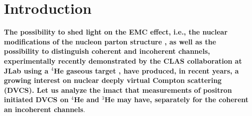 \documentclass[times, twoside]{PosWhiPap}
\begin{document}
\section*{Introduction}
{\bf
The possibility to shed 
   light on the EMC effect, i.e., the nuclear modifications of the nucleon 
   parton structure \cite{Dupre:2015jha, Cloet:2019mql}, as well as
   the possibility to distinguish coherent and incoherent 
   channels, experimentally recently demonstrated by 
   the CLAS collaboration at JLab using a $^4$He gaseous target
     \cite{Hattawy:2017woc, Hattawy:2018liu},
   have produced, in recent years, a growing interest on nuclear deeply virtual Compton scattering (DVCS). Let us analyze
   the imact that measurements of positron initiated DVCS on $^4$He and $^3$He may have, separately for the coherent an incoherent channels}.
\end{document}
